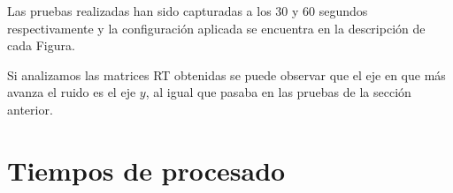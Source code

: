 Las pruebas realizadas han sido capturadas a los 30 y 60 segundos respectivamente y la configuración aplicada se encuentra en la descripción de cada Figura.

Si analizamos las matrices RT obtenidas se puede observar que el eje en que más avanza el ruido es el eje $y$, al igual que pasaba en las pruebas de la sección anterior.


\section{Tiempos de procesado}